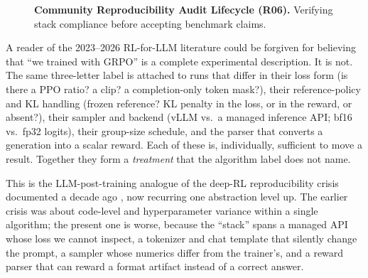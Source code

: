 \documentclass[11pt]{article}
\begin{document}
\begin{figure}[htbp]
\centering
{}
\caption{\textbf{Community Reproducibility Audit Lifecycle (R06).} Verifying stack compliance before accepting benchmark claims.}
\label{fig:min_report_lifecycle}
\end{figure}

A reader of the 2023--2026 RL-for-LLM literature could be forgiven for
believing that ``we trained with GRPO'' is a complete experimental
description. It is not. The same three-letter label is attached to runs that
differ in their loss form (is there a PPO ratio? a clip? a completion-only
token mask?), their reference-policy and KL handling (frozen reference? KL
penalty in the loss, or in the reward, or absent?), their sampler and backend
(vLLM vs.\ a managed inference API; bf16 vs.\ fp32 logits), their group-size
schedule, and the parser that converts a generation into a scalar reward. Each
of these is, individually, sufficient to move a result. Together they form a
\emph{treatment} that the algorithm label does not name.

This is the LLM-post-training analogue of the deep-RL reproducibility crisis
documented a decade ago \cite{henderson2018deep,islam2017reproducibility},
now recurring one abstraction level up. The earlier crisis was about code-level
and hyperparameter variance within a single algorithm; the present one is
worse, because the ``stack'' spans a managed API whose loss we cannot inspect,
a tokenizer and chat template that silently change the prompt, a sampler whose
numerics differ from the trainer's, and a reward parser that can reward a
format artifact instead of a correct answer.
\end{document}
